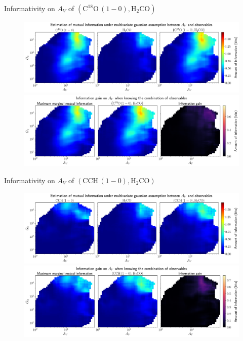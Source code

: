 \documentclass{beamer}
\begin{document}
\begin{frame}{Informativity on $A_V$ of $\left(\mathrm{C^{18}O\,(1-0)},\mathrm{H_2CO}\right)$}
    \begin{figure}
        \centering
        \includegraphics[width=0.95\linewidth]{../linearinfo/av__c18o10_h2co_linearinfo.png}
        \vfill
        \includegraphics[width=0.95\linewidth]{../linearinfo/av__c18o10_h2co_linearinfo_gain.png}
    \end{figure}
\end{frame}

\begin{frame}{Informativity on $A_V$ of $\left(\mathrm{CCH\,(1-0)},\mathrm{H_2CO}\right)$}
    \begin{figure}
        \centering
        \includegraphics[width=0.95\linewidth]{../linearinfo/av__cch10_h2co_linearinfo.png}
        \vfill
        \includegraphics[width=0.95\linewidth]{../linearinfo/av__cch10_h2co_linearinfo_gain.png}
    \end{figure}
\end{frame}
\end{document}
